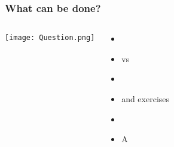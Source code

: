 \begin{frame}
\frametitle{What can be done?}
\begin{columns}[c] %
\texttt{[image: Question.png]}

\begin{itemize}
\item {}
\item {} vs 
\item {} 
\item {} and  exercises
\item {}
\item A  
\end{itemize}
\end{columns}
\end{frame}

